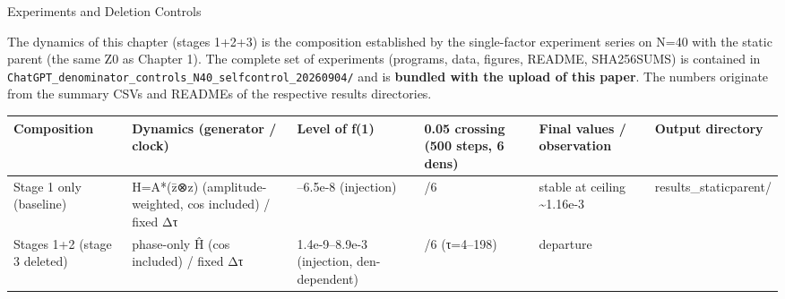 \documentclass[
  a4paper,
]{ltjsarticle}
\newcounter{none} %
\begin{document}
Experiments and Deletion Controls

The dynamics of this chapter (stages 1+2+3) is the composition
established by the single-factor experiment series on N=40 with the
static parent (the same Z0 as Chapter 1). The complete set of
experiments (programs, data, figures, README, SHA256SUMS) is contained
in \texttt{ChatGPT\_denominator\_controls\_N40\_selfcontrol\_20260904/}
and is \textbf{bundled with the upload of this paper}. The numbers
originate from the summary CSVs and READMEs of the respective results
directories.

{\def\LTcaptype{none} %
\begin{longtable}[]{@{}
  >{\raggedright\arraybackslash}p{}
  >{\raggedright\arraybackslash}p{}
  >{\raggedright\arraybackslash}p{}
  >{\raggedright\arraybackslash}p{}
  >{\raggedright\arraybackslash}p{}
  >{\raggedright\arraybackslash}p{}@{}}
\toprule\noalign{}
\begin{minipage}[b]{\linewidth}\raggedright
Composition
\end{minipage} & \begin{minipage}[b]{\linewidth}\raggedright
Dynamics (generator / clock)
\end{minipage} & \begin{minipage}[b]{\linewidth}\raggedright
Level of f(1)
\end{minipage} & \begin{minipage}[b]{\linewidth}\raggedright
0.05 crossing (500 steps, 6 dens)
\end{minipage} & \begin{minipage}[b]{\linewidth}\raggedright
Final values / observation
\end{minipage} & \begin{minipage}[b]{\linewidth}\raggedright
Output directory
\end{minipage} \\
\midrule\noalign{}
\endhead
\bottomrule\noalign{}
\endlastfoot
Stage 1 only (baseline) & H=A*(z̄⊗z) (amplitude-weighted, cos included) /
fixed Δτ & 5.3--6.5e-8 (injection) & 0/6 & stable at ceiling
\textasciitilde1.16e-3 & results\_staticparent/ \\
Stages 1+2 (stage 3 deleted) & phase-only Ĥ (cos included) / fixed Δτ &
1.4e-9--8.9e-3 (injection, den-dependent) & 6/6 (τ=4--198) & departure

\end{longtable}}
\end{document}
